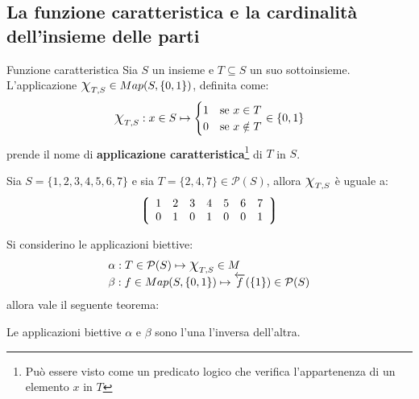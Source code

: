 \subsection{La funzione caratteristica e la cardinalità dell'insieme delle parti}

\begin{defbox}{Funzione caratteristica}
	Sia $S$ un insieme e $T\subseteq S$ un suo sottoinsieme. L'applicazione $\mbox{\Large$\chi$}_{T,S} \in Map(S, \{0,1\})$, definita come:
	\begin{equation}
		\mbox{\Large$\chi$}_{T,S} : x \in S \mapsto \begin{cases}
			1 & \text{se } x \in T \\
			0 & \text{se } x \notin T
		\end{cases} \in \{0,1\}
	\end{equation}
	prende il nome di \textbf{applicazione caratteristica}\footnote{Può essere visto come un predicato logico che verifica l'appartenenza di un elemento $x$ in $T$} di $T$ in $S$.
\end{defbox}

\begin{example}
	Sia $S=\{1,2,3,4,5,6,7\}$ e sia $T = \{2,4,7\} \in \mathcal{P}(S)$, allora $\mbox{\Large$\chi$}_{T,S}$ è uguale a:
	\[
	\left\lgroup
	\begin{array}{ccccccc}
		1 & 2 & 3 & 4 & 5 & 6 & 7 \\
		0 & 1 & 0 & 1 & 0 & 0 & 1
	\end{array}
	\right\rgroup
	\]
\end{example}

Si considerino le applicazioni biettive:
\begin{displaymath}
	\begin{array}{l}
		\alpha: T \in \mathcal{P}(S) \mapsto \mbox{\Large$\chi$}_{T,S} \in M \\
		\beta: f \in Map(S,\{0,1\}) \mapsto \overleftarrow{f}(\{1\}) \in \mathcal{P}(S)
	\end{array}
\end{displaymath}
allora vale il seguente teorema:



\begin{teorbox}
	Le applicazioni biettive $\alpha$ e $\beta$  sono l'una l'inversa dell'altra.
\end{teorbox}

